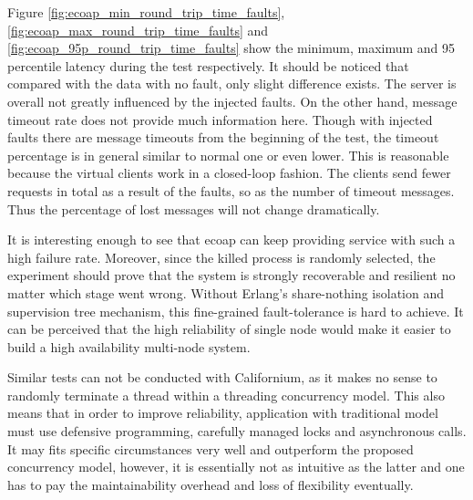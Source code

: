 Figure \ref{fig:ecoap_min_round_trip_time_faults}, \ref{fig:ecoap_max_round_trip_time_faults} and \ref{fig:ecoap_95p_round_trip_time_faults} show the minimum, maximum and 95 percentile latency during the test respectively. It should be noticed that compared with the data with no fault, only slight difference exists. The server is overall not greatly influenced by the injected faults. On the other hand, message timeout rate does not provide much information here. Though with injected faults there are message timeouts from the beginning of the test, the timeout percentage is in general similar to normal one or even lower. This is reasonable because the virtual clients work in a closed-loop fashion. The clients send fewer requests in total as a result of the faults, so as the number of timeout messages. Thus the percentage of lost messages will not change dramatically.

It is interesting enough to see that ecoap can keep providing service with such a high failure rate. Moreover, since the killed process is randomly selected, the experiment should prove that the system is strongly recoverable and resilient no matter which stage went wrong. Without Erlang's share-nothing isolation and supervision tree mechanism, this fine-grained fault-tolerance is hard to achieve. It can be perceived that the high reliability of single node would make it easier to build a high availability multi-node system.

Similar tests can not be conducted with Californium, as it makes no sense to randomly terminate a thread within a threading concurrency model. This also means that in order to improve reliability, application with traditional model must use defensive programming, carefully managed locks and asynchronous calls. It may fits specific circumstances very well and outperform the proposed concurrency model, however, it is essentially not as intuitive as the latter and one has to pay the maintainability overhead and loss of flexibility eventually.

